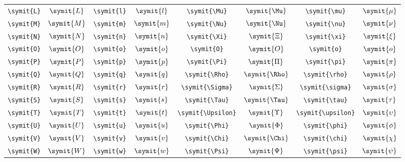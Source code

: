 \begin{longtable}{cccccccc}
    \verb|\symit{L}| & \(\symit{L}\) & \verb|\symit{l}| & \(\symit{l}\) & \verb|\symit{\Mu}|      & \(\symit{\Mu}\)      & \verb|\symit{\mu}|         & \(\symit{\mu}\)         \\
    \verb|\symit{M}| & \(\symit{M}\) & \verb|\symit{m}| & \(\symit{m}\) & \verb|\symit{\Nu}|      & \(\symit{\Nu}\)      & \verb|\symit{\nu}|         & \(\symit{\nu}\)         \\
    \verb|\symit{N}| & \(\symit{N}\) & \verb|\symit{n}| & \(\symit{n}\) & \verb|\symit{\Xi}|      & \(\symit{\Xi}\)      & \verb|\symit{\xi}|         & \(\symit{\xi}\)         \\
    \verb|\symit{O}| & \(\symit{O}\) & \verb|\symit{o}| & \(\symit{o}\) & \verb|\symit{O}|        & \(\symit{O}\)        & \verb|\symit{o}|           & \(\symit{o}\)           \\
    \verb|\symit{P}| & \(\symit{P}\) & \verb|\symit{p}| & \(\symit{p}\) & \verb|\symit{\Pi}|      & \(\symit{\Pi}\)      & \verb|\symit{\pi}|         & \(\symit{\pi}\)         \\
    \verb|\symit{Q}| & \(\symit{Q}\) & \verb|\symit{q}| & \(\symit{q}\) & \verb|\symit{\Rho}|     & \(\symit{\Rho}\)     & \verb|\symit{\rho}|        & \(\symit{\rho}\)        \\
    \verb|\symit{R}| & \(\symit{R}\) & \verb|\symit{r}| & \(\symit{r}\) & \verb|\symit{\Sigma}|   & \(\symit{\Sigma}\)   & \verb|\symit{\sigma}|      & \(\symit{\sigma}\)      \\
    \verb|\symit{S}| & \(\symit{S}\) & \verb|\symit{s}| & \(\symit{s}\) & \verb|\symit{\Tau}|     & \(\symit{\Tau}\)     & \verb|\symit{\tau}|        & \(\symit{\tau}\)        \\
    \verb|\symit{T}| & \(\symit{T}\) & \verb|\symit{t}| & \(\symit{t}\) & \verb|\symit{\Upsilon}| & \(\symit{\Upsilon}\) & \verb|\symit{\upsilon}|    & \(\symit{\upsilon}\)    \\
    \verb|\symit{U}| & \(\symit{U}\) & \verb|\symit{u}| & \(\symit{u}\) & \verb|\symit{\Phi}|     & \(\symit{\Phi}\)     & \verb|\symit{\phi}|        & \(\symit{\phi}\)        \\
    \verb|\symit{V}| & \(\symit{V}\) & \verb|\symit{v}| & \(\symit{v}\) & \verb|\symit{\Chi}|     & \(\symit{\Chi}\)     & \verb|\symit{\chi}|        & \(\symit{\chi}\)        \\
    \verb|\symit{W}| & \(\symit{W}\) & \verb|\symit{w}| & \(\symit{w}\) & \verb|\symit{\Psi}|     & \(\symit{\Psi}\)     & \verb|\symit{\psi}|        & \(\symit{\psi}\)        \\

\end{longtable}
